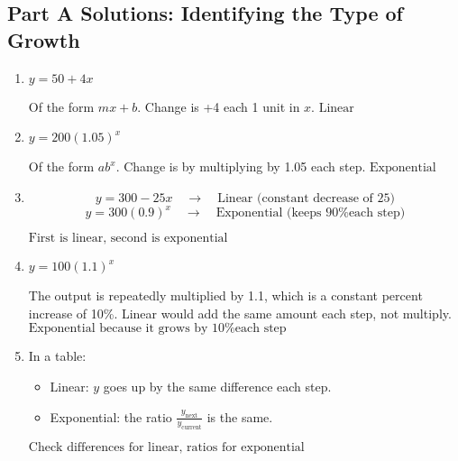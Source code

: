 \documentclass[12pt]{article}
\begin{document}
\subsection*{Part A Solutions: Identifying the Type of Growth}
\begin{enumerate}
  \item \(y = 50 + 4x\)

  Of the form \(mx + b\). Change is +4 each 1 unit in \(x\).  
  \(\boxed{\text{Linear}}\)

  \item \(y = 200(1.05)^x\)

  Of the form \(a b^x\). Change is by multiplying by 1.05 each step.  
  \(\boxed{\text{Exponential}}\)

  \item
  \[
  y = 300 - 25x \quad \rightarrow \quad \text{Linear (constant decrease of 25)}
  \]
  \[
  y = 300(0.9)^x \quad \rightarrow \quad \text{Exponential (keeps 90\% each step)}
  \]

  \(\boxed{\text{First is linear, second is exponential}}\)

  \item \(y = 100(1.1)^x\)

  The output is repeatedly multiplied by 1.1, which is a constant percent increase of 10\%.  
  Linear would add the same amount each step, not multiply.  \newline
  \(\boxed{\text{Exponential because it grows by 10\% each step}}\)

  \item In a table:
  \begin{itemize}
    \item Linear: \(y\) goes up by the same difference each step.
    \item Exponential: the ratio \(\frac{y_{\text{next}}}{y_{\text{current}}}\) is the same.
  \end{itemize}

  \(\boxed{\text{Check differences for linear, ratios for exponential}}\)
\end{enumerate}
\end{document}
